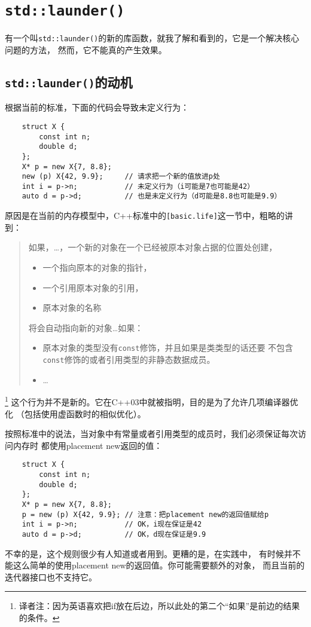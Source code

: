 \chapter{\texttt{std::launder()}}\label{ch32}
有一个叫\texttt{std::launder()}的新的库函数，就我了解和看到的，它是一个解决核心问题的方法，
然而，它不能真的产生效果。


\section{\texttt{std::launder()}的动机}
根据当前的标准，下面的代码会导致未定义行为：
\begin{lstlisting}
    struct X {
        const int n;
        double d;
    };
    X* p = new X{7, 8.8};
    new (p) X{42, 9.9};     // 请求把一个新的值放进p处
    int i = p->n;           // 未定义行为（i可能是7也可能是42）
    auto d = p->d;          // 也是未定义行为（d可能是8.8也可能是9.9）
\end{lstlisting}
原因是在当前的内存模型中，C++标准中的\texttt{[basic.life]}这一节中，粗略的讲到：

\begin{quote}
    如果，\ldots，一个新的对象在一个已经被原本对象占据的位置处创建，
    \begin{itemize}
        \item 一个指向原本的对象的指针，
        \item 一个引用原本对象的引用，
        \item 原本对象的名称
    \end{itemize}
    将会自动指向新的对象\ldots 如果：
    \begin{itemize}
        \item 原本对象的类型没有\texttt{const}修饰，并且如果是类类型的话还要
        不包含\texttt{const}修饰的或者引用类型的非静态数据成员。
        \item \ldots
    \end{itemize}
\end{quote}
\footnote{译者注：因为英语喜欢把if放在后边，所以此处的第二个“如果”是前边的结果的条件。}
这个行为并不是新的。它在C++03中就被指明，目的是为了允许几项编译器优化
（包括使用虚函数时的相似优化）。

按照标准中的说法，当对象中有常量或者引用类型的成员时，我们必须保证每次访问内存时
都使用placement new返回的值：
\begin{lstlisting}
    struct X {
        const int n;
        double d;
    };
    X* p = new X{7, 8.8};
    p = new (p) X{42, 9.9}; // 注意：把placement new的返回值赋给p
    int i = p->n;           // OK，i现在保证是42
    auto d = p->d;          // OK，d现在保证是9.9
\end{lstlisting}
不幸的是，这个规则很少有人知道或者用到。更糟的是，在实践中，
有时候并不能这么简单的使用placement new的返回值。你可能需要额外的对象，
而且当前的迭代器接口也不支持它。

